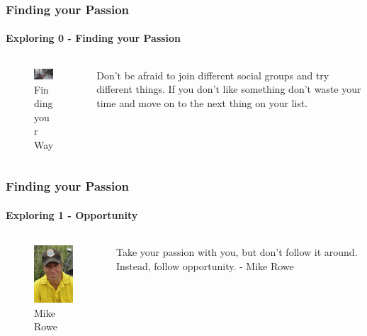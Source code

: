 \documentclass[aspectratio=169]{beamer}
\begin{document}
\begin{frame}
  \frametitle{Finding your Passion}
  \framesubtitle{Exploring 0 - Finding your Passion}
  \begin{columns}[onlytextwidth]
    \begin{column}{.30\textwidth}
      \begin{figure}
        \includegraphics[width=5.5cm,keepaspectratio]{compass}
        \caption{Finding your Way}
      \end{figure}
    \end{column}
    \hfill
    \begin{column}{.60\textwidth}
        \begin{tcolorbox}[title=finding\_your\_passion.log,colback=gray]
          Don't be afraid to join different social groups and try different things.
          If you don't like something don't waste your time and move on to the next thing on your list.
        \end{tcolorbox}
    \end{column}
  \end{columns}
\end{frame}

\begin{frame}
  \frametitle{Finding your Passion}
  \framesubtitle{Exploring 1 - Opportunity}
  \begin{columns}[onlytextwidth]
    \begin{column}{.30\textwidth}
      \begin{figure}
        \includegraphics[width=4cm,keepaspectratio]{mike_rowe}
        \caption{Mike Rowe}
      \end{figure}
    \end{column}
    \hfill
    \begin{column}{.60\textwidth}
        \begin{tcolorbox}[title=mike\_rowe.log,colback=gray]
          Take your passion with you, but don't follow it around. Instead, follow opportunity. - Mike Rowe
        \end{tcolorbox}
    \end{column}
  \end{columns}
\end{frame}
\end{document}

